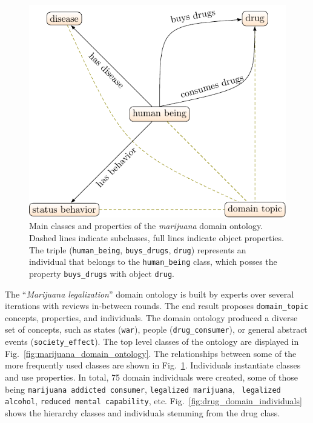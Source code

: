 \begin{figure}
	\centering
	\footnotesize
	\includegraphics{formalizations_marijuana_main_classes-figure0.pdf}
\caption{Main classes and properties of the \textit{marijuana} domain 
ontology. 
Dashed lines indicate subclasses, full lines indicate object properties. 
The triple (\texttt{human\_being}, \texttt{buys\_drugs}, \texttt{drug}) represents an 
individual that belongs to the
\texttt{human\_being} class, which posses the property \texttt{buys\_drugs} with 
object \texttt{drug}.
} 
\label{fig:main-classes}
\end{figure}

The ``\emph{Marijuana legalization}'' domain ontology is built by experts over
several iterations with reviews in-between rounds. The end result proposes 
\texttt{domain\_topic} concepts, properties, and individuals. The 
domain ontology produced a diverse set of concepts, such as states (\texttt{war}),
people (\texttt{drug\_consumer}), or general abstract events (\texttt{society\_effect}). 
The top level classes of the ontology are displayed in 
Fig.~\ref{fig:marijuana_domain_ontology}. The relationships between some of the more frequently
used classes are shown in Fig.~\ref{fig:main-classes}. 
Individuals instantiate classes
and use properties. In total, 75 domain individuals were created, some of those
being \texttt{marijuana addicted consumer}, \texttt{legalized marijuana}, \texttt{
legalized alcohol}, \texttt{reduced mental capability}, etc. 
Fig.~\ref{fig:drug_domain_individuals} shows the hierarchy classes and 
individuals stemming from the drug class. 

